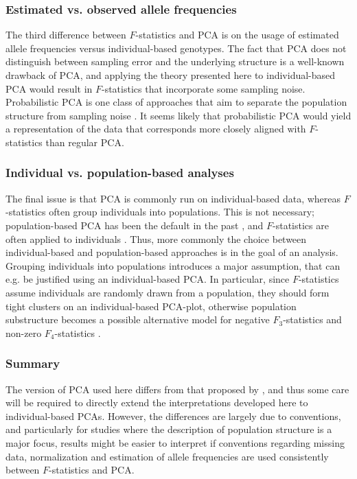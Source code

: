 \documentclass[12pt,fullpage, a4paper]{article}
\begin{document}
\subsubsection{Estimated vs. observed allele frequencies}
The third difference between $F$-statistics and PCA is on the usage of estimated allele frequencies versus individual-based genotypes. The fact that PCA does not distinguish between sampling error and the underlying structure is a well-known drawback of PCA, and applying the theory presented here to individual-based PCA would result in $F$-statistics that incorporate some sampling noise. Probabilistic PCA is one class of approaches that aim to separate the population structure from sampling noise \citep[e.g.][]{agrawal2020}. It seems likely that probabilistic PCA would yield a representation of the data that corresponds more closely aligned with $F$-statistics than regular PCA.


\subsubsection{Individual vs. population-based analyses}
The final issue is that PCA is commonly run on individual-based data, whereas $F$-statistics often group individuals into populations. This is not necessary; population-based PCA has been the default in the past \citep{cavalli-sforza1994}, and $F$-statistics are often applied to individuals \citep[e.g.][]{green2010, massilani2020, yang2020}. Thus, more commonly the choice between individual-based and population-based approaches is in the goal of an analysis. Grouping individuals into populations introduces a major assumption, that can e.g. be justified using an individual-based PCA. In particular, since $F$-statistics assume individuals are randomly drawn from a population, they should form tight clusters on an individual-based PCA-plot, otherwise population substructure becomes a possible alternative model for negative $F_3$-statistics and non-zero $F_4$-statistics \citep{peter2016}.

\subsubsection{Summary}
The version of PCA used here differs from that proposed by \cite{patterson2006}, and thus some care will be required to directly extend the interpretations developed here to individual-based PCAs. However, the differences are largely due to conventions, and particularly for studies where the description of population structure is a major focus, results might be easier to interpret if conventions regarding missing data, normalization and estimation of allele frequencies are used consistently between $F$-statistics and PCA.
\end{document}
